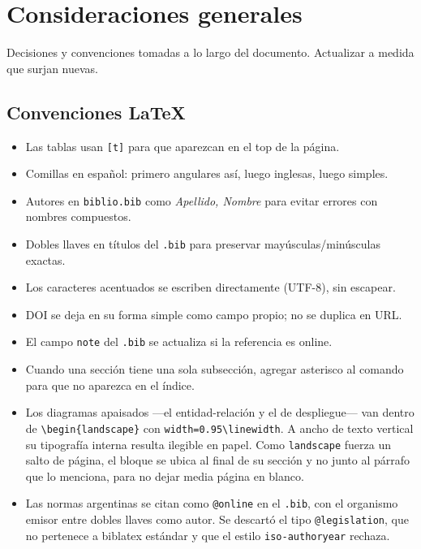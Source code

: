 \section*{Consideraciones generales}

Decisiones y convenciones tomadas a lo largo del documento. Actualizar a medida que surjan nuevas.

\subsection*{Convenciones LaTeX}
\begin{itemize}
    \item Las tablas usan \texttt{[t]} para que aparezcan en el top de la página.
    \item Comillas en español: primero angulares \guillemotleft así\guillemotright, luego inglesas, luego simples.
    \item Autores en \texttt{biblio.bib} como \emph{Apellido, Nombre} para evitar errores con nombres compuestos.
    \item Dobles llaves en títulos del \texttt{.bib} para preservar mayúsculas/minúsculas exactas.
    \item Los caracteres acentuados se escriben directamente (UTF-8), sin escapear.
    \item DOI se deja en su forma simple como campo propio; no se duplica en URL.
    \item El campo \texttt{note} del \texttt{.bib} se actualiza si la referencia es online.
    \item Cuando una sección tiene una sola subsección, agregar asterisco al comando para que no aparezca en el índice.
    \item Los diagramas apaisados —el entidad-relación y el de despliegue— van dentro de \texttt{\textbackslash begin\{landscape\}} con \texttt{width=0.95\textbackslash linewidth}. A ancho de texto vertical su tipografía interna resulta ilegible en papel. Como \texttt{landscape} fuerza un salto de página, el bloque se ubica al final de su sección y no junto al párrafo que lo menciona, para no dejar media página en blanco.
    \item Las normas argentinas se citan como \texttt{@online} en el \texttt{.bib}, con el organismo emisor entre dobles llaves como autor. Se descartó el tipo \texttt{@legislation}, que no pertenece a biblatex estándar y que el estilo \texttt{iso-authoryear} rechaza.
\end{itemize}

